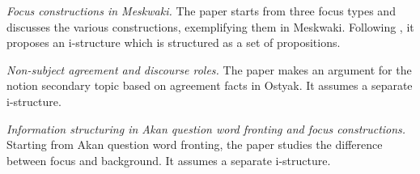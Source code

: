 \documentclass[output=paper,hidelinks]{langscibook}
\begin{document}

\vspace{+6pt}
\citet{Dalstrom03} \textit{Focus constructions in Meskwaki.} The paper starts from  three focus types and discusses the various constructions, exemplifying them in Meskwaki. Following \citet{Lambrecht}, it proposes an i-structure which is structured as a set of propositions. 


\vspace{+6pt}
\citet{DN05} \textit{Non-subject agreement and discourse roles.} The paper makes an argument for the notion secondary topic based on agreement facts in Ostyak. It assumes a separate i-structure. 


\vspace{+6pt}
\citet{MB05} \textit{Information structuring in Akan question word fronting and focus constructions.} Starting from Akan question word fronting, the paper studies the difference between focus and background. It assumes a separate i-structure.
\end{document}
